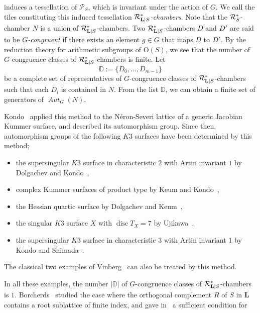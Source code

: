 \documentclass{amsart}
\theoremstyle{plain}
\theoremstyle{definition}
\theoremstyle{remark}
\numberwithin{equation}{section}
\numberwithin{table}{section}
\numberwithin{figure}{section}
\newcommand{\D}{\mathord{\mathbb D}}
\newcommand{\PPP}{\mathord{\mathcal P}}
\newcommand{\RRR}{\mathord{\mathcal R}}
\newcommand{\sprime}{\sp\prime}
\newcommand{\OG}{\mathord{\mathrm {O}}}
\newcommand{\disc}{\operatorname{\mathrm {disc}}\nolimits}
\renewcommand{\L}{\mathord{\mathbf{L}}}
\newcommand{\aut}{\operatorname{\mathit {Aut}}\nolimits}
\newcommand{\Roots}{\RRR}
\newcommand{\sphyp}{\sp*}
\newcommand{\RtsLS}{\Roots_{\L|S}}
\newcommand{\Nc}{N}
\begin{document}
induces a tessellation of $\PPP_S$,
which is invariant under the action of $G$.
We call the tiles constituting this induced tessellation
 \emph{$\RtsLS\sphyp$-chambers}.
Note that the $\Roots_{S}\sphyp$-chamber $\Nc$ is a union of $\RtsLS\sphyp$-chambers.
Two $\RtsLS\sphyp$-chambers $D$ and $D\sprime$ are said to be \emph{$G$-congruent}
if there exists an element $g\in G$ that maps $D$ to $D\sprime$.
By  the  reduction theory for arithmetic subgroups of $\OG (S)$,
we see that
the number of $G$-congruence classes of $\RtsLS\sphyp$-chambers is finite.
Let 
$$
\D:=\{ D_0, \dots, D_{m-1}\}
$$
be a complete set of representatives of $G$-congruence classes 
of $\RtsLS\sphyp$-chambers such that each $D_i$ is contained in $\Nc$.
From the list $\D$, we can obtain a finite set of generators of $\aut_{G}(\Nc)$.
%
\par
%
Kondo~\cite{MR1618132} applied this method to the N\'eron-Severi lattice of
a generic Jacobian Kummer surface,
and described its automorphism group.
Since then,
automorphism groups of the following $K3$ surfaces have been determined by this method;
\begin{itemize}
\item[(a)] the supersingular $K3$ surface in characteristic $2$ 
with Artin invariant $1$ by Dolgachev and Kondo~\cite{MR1935564K},
\item[(b)] complex Kummer surfaces of product type
by Keum and Kondo~\cite{MR1806732}, 
\item[(c)] the Hessian quartic surface by Dolgachev and Keum~\cite{MR1897389},
\item[(d)] the singular $K3$ surface $X$ with $\disc T_X=7$ by Ujikawa~\cite{MR3113614}, 
\item[(e)] the supersingular $K3$ surface in characteristic $3$ 
with Artin invariant $1$ by
Kondo and Shimada~\cite{KondoShimada}.
\end{itemize}
%
The classical two examples of Vinberg~\cite{MR719348} can also be  treated by this method.
\par
In all these examples, the number $|\D|$ of $G$-congruence classes 
of $\RtsLS\sphyp$-chambers is $1$. 
Borcherds~\cite{MR913200} studied the case 
where the orthogonal complement  $R$ of $S$ in $\L$
contains a root sublattice of finite index,
and gave in~\cite[Lemma 5.1]{MR913200}
 a sufficient condition for 
\end{document}
